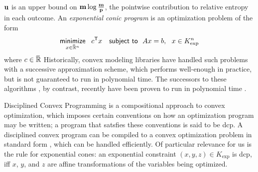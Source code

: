 \documentclass[twoside]{article}
\begin{document}
$\mathbf{u}$ is an upper bound on $\mathbf{m} \log \frac{\mathbf{m}}{\mathbf{p}}$, 
the pointwise contribution to relative entropy in each outcome. 
%
An \emph{exponential conic program} is an optimization problem of the form
\[ 
    \mathop{\text{\sf minimize}}\limits_{x \in \mskip1mu\overline{\mskip-1mu\mathbb R\!}\,^n}~~ c^{\sf T} x
    \quad\text{\sf subject to}~~ Ax = b,~~x \in K_{\exp}^n
\]
where $c \in \mskip1mu\overline{\mskip-1mu\mathbb R\!}\,$
Historically, convex modeling libraries have handled such problems with a successive approximation scheme, which performs well-enough in practice, but is not guaranteed to run in polynomial time. 
The successors to these algorithms \parencite{dahl2022primal}, by contrast, recently have been proven to run in polynomial time \parencite{badenbroek2021algorithm}. 

Disciplined Convex Programming \parencite{dcp-thesis} is a
    compositional approach to convex optimization, which imposes certain conventions on how an optimization program may be written; a program that satsfies these conventions is said to be dcp. 
A disciplined convex program can be compiled to a convex optimization problem in standard form \parencite{agrawal2018rewriting}, which can be handled efficiently.
Of particular relevance for us is the rule for 
exponential cones: an exponential %
constraint $(x,y,z) \in K_{\exp}$ is dcp, iff $x$, $y$, and $z$ are affine transformations of the variables being optimized. 

\end{document}
